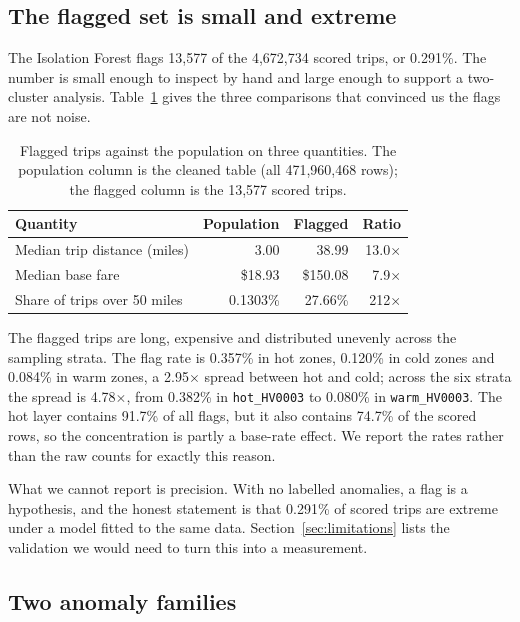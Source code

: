 \documentclass[11pt,a4paper]{article}
\newcommand{\code}[1]{\texttt{\small #1}}
\begin{document}
\subsection{The flagged set is small and extreme}

The Isolation Forest flags 13{,}577 of the 4{,}672{,}734 scored trips, or 0.291\%. The number is small enough to inspect by hand and large enough to support a two-cluster analysis. Table~\ref{tab:anomaly-evidence} gives the three comparisons that convinced us the flags are not noise.

\begin{table}[t]
\centering
\small
\caption{Flagged trips against the population on three quantities. The population column is the cleaned table (all 471{,}960{,}468 rows); the flagged column is the 13{,}577 scored trips.}
\label{tab:anomaly-evidence}
\begin{tabular}{lrrr}
\toprule
Quantity & Population & Flagged & Ratio \\
\midrule
Median trip distance (miles) & 3.00 & 38.99 & 13.0$\times$ \\
Median base fare & \$18.93 & \$150.08 & 7.9$\times$ \\
Share of trips over 50 miles & 0.1303\% & 27.66\% & 212$\times$ \\
\bottomrule
\end{tabular}
\end{table}

The flagged trips are long, expensive and distributed unevenly across the sampling strata. The flag rate is 0.357\% in hot zones, 0.120\% in cold zones and 0.084\% in warm zones, a 2.95$\times$ spread between hot and cold; across the six strata the spread is 4.78$\times$, from 0.382\% in \code{hot\_HV0003} to 0.080\% in \code{warm\_HV0003}. The hot layer contains 91.7\% of all flags, but it also contains 74.7\% of the scored rows, so the concentration is partly a base-rate effect. We report the rates rather than the raw counts for exactly this reason.

What we cannot report is precision. With no labelled anomalies, a flag is a hypothesis, and the honest statement is that 0.291\% of scored trips are extreme under a model fitted to the same data. Section~\ref{sec:limitations} lists the validation we would need to turn this into a measurement.

\subsection{Two anomaly families}
\end{document}
